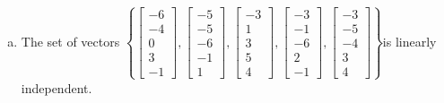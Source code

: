 \begin{exerciseAnswer}
\begin{enumerate}[(a)]
\item  The set of vectors \( \left\{ \left[\begin{array}{c}
-6 \\
-4 \\
0 \\
3 \\
-1
\end{array}\right] , \left[\begin{array}{c}
-5 \\
-5 \\
-6 \\
-1 \\
1
\end{array}\right] , \left[\begin{array}{c}
-3 \\
1 \\
3 \\
5 \\
4
\end{array}\right] , \left[\begin{array}{c}
-3 \\
-1 \\
-6 \\
2 \\
-1
\end{array}\right] , \left[\begin{array}{c}
-3 \\
-5 \\
-4 \\
3 \\
4
\end{array}\right] \right\} \)is linearly independent.
\end{enumerate}
    
\end{exerciseAnswer}
    
